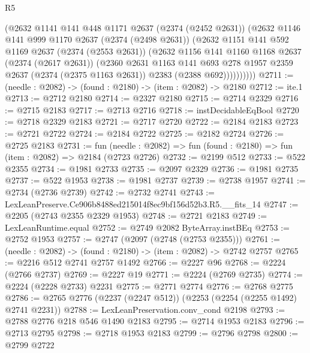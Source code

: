 \begin{lexlean}{R5}
\begin{coremodule}
            (@2632
              @1141
              @141
              @448
              @1171
              @2637
              (@2374 (@2452 @2631))
              (@2632
                @1146
                @141
                @999
                @1170
                @2637
                (@2374 (@2498 @2631))
                (@2632
                  @1151
                  @141
                  @592
                  @1169
                  @2637
                  (@2374 (@2553 @2631))
                  (@2632
                    @1156
                    @141
                    @1160
                    @1168
                    @2637
                    (@2374 (@2617 @2631))
                    (@2360
                      @2631
                      @1163
                      @141
                      @693
                      @278
                      @1957
                      @2359
                      @2637
                      (@2374 (@2375 @1163 @2631))
                      @2383
                      (@2388 @692))))))))))
@2711 := (needle : @2082) -> (found : @2180) -> (item : @2082) -> @2180
@2712 := ite.{1}
@2713 := @2712 @2180
@2714 := @2327 @2180
@2715 := @2714 @2329
@2716 := @2715 @2183
@2717 := @2713 @2716
@2718 := instDecidableEqBool
@2720 := @2718 @2329 @2183
@2721 := @2717 @2720
@2722 := @2184 @2183
@2723 := @2721 @2722
@2724 := @2184 @2722
@2725 := @2182 @2724
@2726 := @2725 @2183
@2731 := fun (needle : @2082) => fun (found : @2180) => fun (item : @2082) => @2184 (@2723 @2726)
@2732 := @2199 @512
@2733 := @522 @2355
@2734 := @1981 @2733
@2735 := @2097 @2329
@2736 := @1981 @2735
@2737 := @522 @1953
@2738 := @1981 @2737
@2739 := @2738 @1957
@2741 := @2734 (@2736 @2739)
@2742 := @2732 @2741
@2743 := LexLeanPreserve.Ce906b8488ed215014f8ec9bf156d52b3.R5.__fits_14
@2747 := @2205 (@2743 @2355 @2329 @1953)
@2748 := @2721 @2183
@2749 := LexLeanRuntime.equal
@2752 := @2749 @2082 ByteArray.instBEq
@2753 := @2752 @1953
@2757 := @2747 (@2097 (@2748 (@2753 @2355)))
@2761 := (needle : @2082) -> (found : @2180) -> (item : @2082) -> @2742 @2757
@2765 := @2216 @512 @2741 @2757 @1492
@2766 := @2227 @96
@2768 := @2224 (@2766 @2737)
@2769 := @2227 @19
@2771 := @2224 (@2769 @2735)
@2774 := @2224 (@2228 @2733) @2231
@2775 := @2771 @2774
@2776 := @2768 @2775
@2786 := @2765 @2776 (@2237 (@2247 @512)) (@2253 (@2254 (@2255 @1492) @2741 @2231))
@2788 := LexLeanPreservation.conv_cond @2198
@2793 := @2788 @2776 @218 @546 @1490 @2183
@2795 := @2714 @1953 @2183
@2796 := @2713 @2795
@2798 := @2718 @1953 @2183
@2799 := @2796 @2798
@2800 := @2799 @2722

\end{coremodule}
\end{lexlean}
